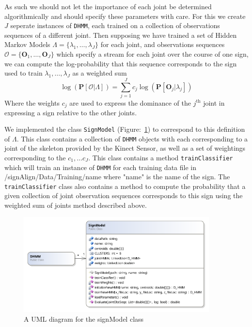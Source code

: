 As such we should not let the importance of each joint be determined algorithmically and should specify these parameters with care. For this we create $J$ seperate instances of \verb|DHMM|, each trained on a collection of observations sequences of a different joint. Then supposing we have trained a set of Hidden Markov Models $\Lambda = \{\lambda_1, \dots, \lambda_J\}$ for each joint, and observations sequences $\mathcal{O} = \{\mathbf{O}_1,\dots, \mathbf{O}_J\}$ which specify a stream for each joint over the course of one sign, we can compute the log-probability that this sequence corresponds to the sign used to train $\lambda_1, \dots, \lambda_J$ as a weighted sum
\begin{equation*}
\log(\mathbf{P}[\mathcal{O} | \Lambda ]) = \sum_{j=1}^{J} c_j \log(\mathbf{P}[\mathbf{O}_j | \lambda_j])
\end{equation*}
Where the weights $c_j$ are used to express the dominance of the $j^\text{th}$ joint in expressing a sign relative to the other joints.

We implemented the class \verb|SignModel| (Figure:~\ref{fig:signModel}) to correspond to this definition of $\Lambda$. This class contains a collection of \verb|DHMM| objects with each corresponding to a joint of the skeleton provided by the Kinect Sensor, as well as a set of weightings corresponding to the $c_1, \dots c_J$. This class contains a method \verb|trainClassifier| which will train an instance of \verb|DHMM| for each training data file in /signAlign/Data/Training/name where "name" is the name of the sign. The \verb|trainClassifier| class also contains a method to compute the probability that a given collection of joint observation sequences corresponds to this sign using the weighted sum of joints method described above.
\begin{figure}
        \centering
        \includegraphics[width=0.9\textwidth]{ThesisFigs/signModelDiag}
        \caption{A UML diagram for the signModel class}\label{fig:signModel}
\end{figure}

